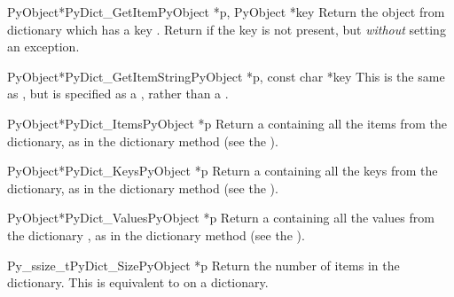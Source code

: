 \begin{cfuncdesc}{PyObject*}{PyDict_GetItem}{PyObject *p, PyObject *key}
  Return the object from dictionary  which has a key
  .  Return \NULL{} if the key  is not present, but
  \emph{without} setting an exception.
\end{cfuncdesc}

\begin{cfuncdesc}{PyObject*}{PyDict_GetItemString}{PyObject *p, const char *key}
  This is the same as , but  is
  specified as a , rather than a .
\end{cfuncdesc}

\begin{cfuncdesc}{PyObject*}{PyDict_Items}{PyObject *p}
  Return a  containing all the items from the
  dictionary, as in the dictionary method  (see the
  ).
\end{cfuncdesc}

\begin{cfuncdesc}{PyObject*}{PyDict_Keys}{PyObject *p}
  Return a  containing all the keys from the
  dictionary, as in the dictionary method  (see the
  ).
\end{cfuncdesc}

\begin{cfuncdesc}{PyObject*}{PyDict_Values}{PyObject *p}
  Return a  containing all the values from the
  dictionary , as in the dictionary method 
  (see the ).
\end{cfuncdesc}

\begin{cfuncdesc}{Py_ssize_t}{PyDict_Size}{PyObject *p}
  Return the number of items in the dictionary.  This is equivalent
  to  on a dictionary.
\end{cfuncdesc}

